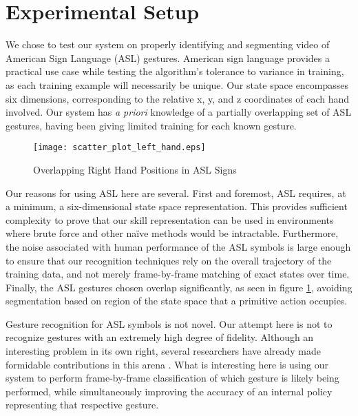 \documentclass[letterpaper]{article}
\begin{document}
\section{Experimental Setup}
\label{sec:experiment}
We chose to test our system on properly identifying and segmenting video of American Sign Language (ASL) gestures. American sign language provides a practical use case while testing the algorithm's tolerance to variance in training, as each training example will necessarily be unique. Our state space encompasses six dimensions, corresponding to the relative x, y, and z coordinates of each hand involved.  Our system has \textit{a priori} knowledge of a partially overlapping set of ASL gestures, having been giving limited training for each known gesture.

\begin{figure}
\begin{center}
\texttt{[image: scatter\_plot\_left\_hand.eps]}
\caption{Overlapping Right Hand Positions in ASL Signs}
\label{fig:asl_sign_overlap}
\end{center}
\end{figure}

Our reasons for using ASL here are several.  First and foremost, ASL requires, at a minimum, a six-dimensional state space representation.  This provides sufficient complexity to prove that our skill representation can be used in environments where brute force and other na\"ive methods would be intractable.  Furthermore, the noise associated with human performance of the ASL symbols is large enough to ensure that our recognition techniques rely on the overall trajectory of the training data, and not merely frame-by-frame matching of exact states over time.  Finally, the ASL gestures chosen overlap significantly, as seen in figure \ref{fig:asl_sign_overlap}, avoiding segmentation based on region of the state space that a primitive action occupies.

Gesture recognition for ASL symbols is not novel.  Our attempt here is not to recognize gestures with an extremely high degree of fidelity.  Although an interesting problem in its own right, several researchers have already made formidable contributions in this arena \cite{HandGestures,HSMMRecognition,POMDPGesture,HoughASL,ASLRealTime,MotionASL}.  What is interesting here is using our system to perform frame-by-frame classification of which gesture is likely being performed, while simultaneously improving the accuracy of an internal policy representing that respective gesture.
\end{document}
